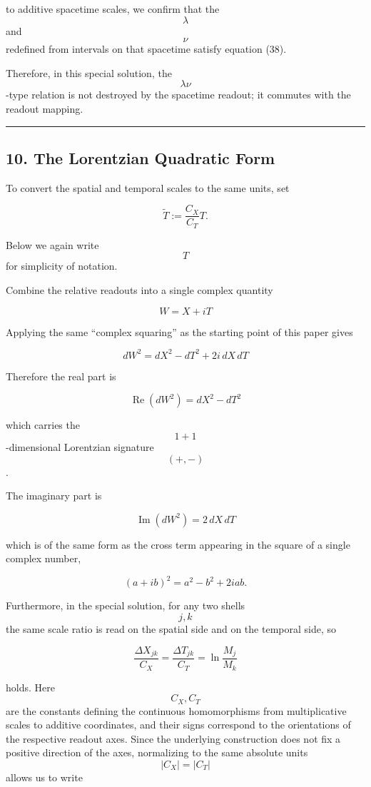 \documentclass[
  a4paper,
]{article}
\begin{document}
to additive spacetime scales, we confirm that the \[\lambda\] and
\[\nu\] redefined from intervals on that spacetime satisfy equation
(38).

Therefore, in this special solution, the \[\lambda\nu\]-type relation is
not destroyed by the spacetime readout; it commutes with the readout
mapping.

\begin{center}\rule{0.5\linewidth}{0.5pt}\end{center}

\subsection{10. The Lorentzian Quadratic
Form}\label{the-lorentzian-quadratic-form}

To convert the spatial and temporal scales to the same units, set

\[
\widetilde T
:=
\frac{C_X}{C_T}T.
\]

Below we again write \[T\] for simplicity of notation.

Combine the relative readouts into a single complex quantity

\[
\boxed{
W=X+iT
}
\tag{40}
\]

Applying the same ``complex squaring'' as the starting point of this
paper gives

\[
\boxed{
dW^2
=dX^2-dT^2+2i\,dX\,dT
}
\tag{41}
\]

Therefore the real part is

\[
\boxed{
\operatorname{Re}(dW^2)
=dX^2-dT^2
}
\tag{42}
\]

which carries the \[1+1\]-dimensional Lorentzian signature \[(+,-)\].

The imaginary part is

\[
\boxed{
\operatorname{Im}(dW^2)
=2\,dX\,dT
}
\tag{43}
\]

which is of the same form as the cross term appearing in the square of a
single complex number,

\[
(a+ib)^2=a^2-b^2+2iab.
\]

Furthermore, in the special solution, for any two shells \[j,k\] the
same scale ratio is read on the spatial side and on the temporal side,
so

\[
\frac{\Delta X_{jk}}{C_X}
=
\frac{\Delta T_{jk}}{C_T}
=
\ln\frac{M_j}{M_k}
\]

holds. Here \[C_X,C_T\] are the constants defining the continuous
homomorphisms from multiplicative scales to additive coordinates, and
their signs correspond to the orientations of the respective readout
axes. Since the underlying construction does not fix a positive
direction of the axes, normalizing to the same absolute units
\[|C_X|=|C_T|\] allows us to write
\end{document}
